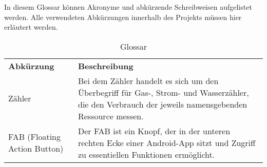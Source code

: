 \begin{tcolorbox}
	In diesem Glossar können Akronyme und abkürzende Schreibweisen aufgelistet werden. 
	Alle verwendeten Abkürzungen innerhalb des Projekts müssen hier erläutert werden.
\end{tcolorbox}

\begin{table}[h]
	\centering
	\begin{tabularx}{\textwidth}{X X}
		\rowcolor[HTML]{C0C0C0} 
		\textbf{Abkürzung} & \textbf{Beschreibung} \\
		Zähler & Bei dem Zähler handelt es sich um den Überbegriff für Gas-, Strom- und Wasserzähler, die den Verbrauch der jeweils namensgebenden Ressource messen. \\
		\rowcolor[HTML]{E7E7E7} 
		FAB (Floating Action Button) & Der FAB ist ein Knopf, der in der unteren rechten Ecke einer Android-App sitzt und Zugriff zu essentiellen Funktionen ermöglicht.
	\end{tabularx}
	\caption{Glossar}
	\label{table:glossar}
\end{table}